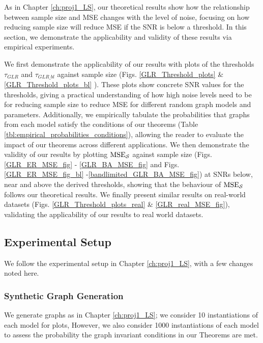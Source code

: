 As in Chapter \ref{ch:proj1_LS}, our theoretical results show how the relationship between sample size and MSE changes with the level of noise, focusing on how reducing sample size will reduce MSE if the SNR is below a threshold. In this section, we demonstrate  the applicability and validity of these results via empirical experiments. 


We first demonstrate the applicability of our results with plots of the thresholds $\tau_{GLR}$ and $\tau_{GLR\_bl}$ against sample size (Figs. \ref{GLR_Threshold_plots} \& \ref{GLR_Threshold_plots_bl} ). These plots show concrete SNR values for the thresholds, giving a practical understanding of how high noise levels need to be for reducing sample size to reduce MSE for different random graph models and parameters. Additionally, we empirically tabulate the probabilities that graphs from each model  satisfy the conditions of our theorems (Table \ref{tbl:empirical_probabilities_conditions}), allowing the reader to evaluate the impact of our theorems across different applications. We then demonstrate the validity of our results by plotting $\textrm{MSE}_{\mathcal{S}}$ against sample size (Figs. \ref{GLR_ER_MSE_fig} - \ref{GLR_BA_MSE_fig} and Figs. \ref{GLR_ER_MSE_fig_bl} -\ref{bandlimited_GLR_BA_MSE_fig}) at SNRs below, near and above the derived thresholds, showing that the behaviour of $\textrm{MSE}_{\mathcal{S}}$ follows our theoretical results. We finally present similar results on real-world datasets (Figs. \ref{GLR_Threshold_plots_real} \& \ref{GLR_real_MSE_fig}), validating the applicability of our results to real world datasets.

\subsection{Experimental Setup}
    We follow the experimental setup in Chapter \ref{ch:proj1_LS}, with a few changes noted here.

\subsubsection{Synthetic Graph Generation}
We generate graphs as in Chapter \ref{ch:proj1_LS}; we consider 10 instantiations of each model for plots, However, we also consider 1000 instantiations of each model to assess the probability the graph invariant conditions in our Theorems are met.

